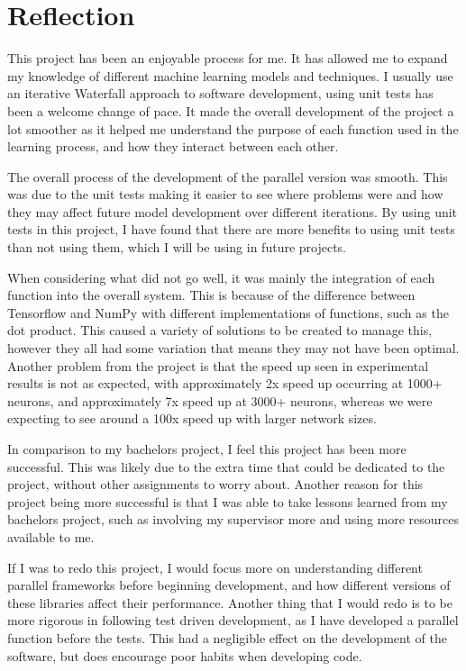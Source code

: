 \section{Reflection}
This project has been an enjoyable process for me.
It has allowed me to expand my knowledge of different machine learning models and techniques.
I usually use an iterative Waterfall approach to software development, using unit tests has been a welcome change of pace.
It made the overall development of the project a lot smoother as it helped me understand the purpose of each function used in the learning process, and how they interact between each other.

The overall process of the development of the parallel version was smooth. 
This was due to the unit tests making it easier to see where problems were and how they may affect future model development over different iterations.
By using unit tests in this project, I have found that there are more benefits to using unit tests than not using them, which I will be using in future projects.

When considering what did not go well, it was mainly the integration of each function into the overall system.
This is because of the difference between Tensorflow and NumPy with different implementations of functions, such as the dot product.
This caused a variety of solutions to be created to manage this, however they all had some variation that means they may not have been optimal.
Another problem from the project is that the speed up seen in experimental results is not as expected, with approximately 2x speed up occurring at 1000+ neurons, and approximately 7x speed up at 3000+ neurons, whereas we were expecting to see around a 100x speed up with larger network sizes.

In comparison to my bachelors project, I feel this project has been more successful. This was likely due to the extra time that could be dedicated to the project, without other assignments to worry about.
Another reason for this project being more successful is that I was able to take lessons learned from my bachelors project, such as involving my supervisor more and using more resources available to me.

If I was to redo this project, I would focus more on understanding different parallel frameworks before beginning development, and how different versions of these libraries affect their performance.
Another thing that I would redo is to be more rigorous in following test driven development, as I have developed a parallel function before the tests.
This had a negligible effect on the development of the software, but does encourage poor habits when developing code.